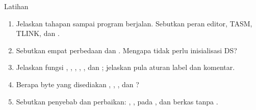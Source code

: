 \documentclass[aspectratio=169,11pt]{beamer}
\begin{document}
\begin{frame}{Latihan}
\small
\begin{enumerate}
    \item Jelaskan tahapan  sampai program berjalan.
          Sebutkan peran editor, TASM, TLINK, dan .

    \vspace{0.15em}
    \item Sebutkan empat perbedaan  dan .
          Mengapa  tidak perlu inisialisasi DS?

    \vspace{0.15em}
    \item Jelaskan fungsi , , ,
          , , dan ; jelaskan pula
          aturan label dan komentar.

    \vspace{0.15em}
    \item Berapa byte yang disediakan ,
          , , dan
          ?

    \vspace{0.15em}
    \item Sebutkan penyebab dan perbaikan: ,
          ,  pada
          , dan berkas tanpa .
\end{enumerate}
\end{frame}
\end{document}

